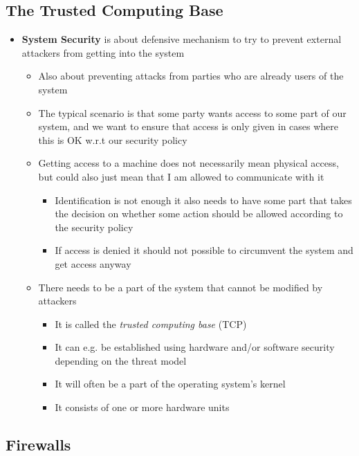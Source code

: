 \documentclass[11pt]{article}
\begin{document}
\subsection{The Trusted Computing Base}
\label{sec:orgbb6531a}
\begin{itemize}
\item \textbf{System Security} is about defensive mechanism to try to prevent external attackers from getting into the system
\begin{itemize}
\item Also about preventing attacks from parties who are already users of the system
\item The typical scenario is that some party wants access to some part of our system, and we want to ensure that access is only given in cases where this is OK w.r.t our security policy
\item Getting access to a machine does not necessarily mean physical access, but could also just mean that I am allowed to communicate with it
\begin{itemize}
\item Identification is not enough it also needs to have some part that takes the decision on whether some action should be allowed according to the security policy
\item If access is denied it should not possible to circumvent the system and get access anyway
\end{itemize}
\item There needs to be a part of the system that cannot be modified by attackers
\begin{itemize}
\item It is called the \emph{trusted computing base} (TCP)
\item It can e.g. be established using hardware and/or software security depending on the threat model
\item It will often be a part of the operating system's kernel
\item It consists of one or more hardware units
\end{itemize}
\end{itemize}
\end{itemize}

\subsection{Firewalls}
\label{sec:org520d7b6}
\end{document}
